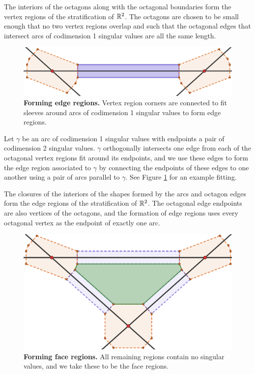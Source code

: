 The interiors of the octagons along with the octagonal boundaries form the vertex regions of the stratification of $\mathbb{R}^2$.
The octagons are chosen to be small enough that no two vertex regions overlap and such that the octagonal edges that intersect arcs of codimension 1 singular values are all the same length.

\begin{figure}[h!]
	\centering
	\includegraphics[width=\textwidth]{figures/edge-sleeve.png}
	\caption{
		\textbf{Forming edge regions.}
		Vertex region corners are connected to fit sleeves around arcs of codimension 1 singular values to form edge regions.  
	}
	\label{fig:edge-sleeve}
\end{figure}

Let $\gamma$ be an arc of codimension 1 singular values with endpoints a pair of codimension 2 singular values.
$\gamma$ orthogonally intersects one edge from each of the octagonal vertex regions fit around its endpoints, and we use these edges to form the edge region associated to $\gamma$ by connecting the endpoints of these edges to one another using a pair of arcs parallel to $\gamma$.
See Figure \ref{fig:edge-sleeve} for an example fitting.

The closures of the interiors of the shapes formed by the arcs and octagon edges form the edge regions of the stratification of $\mathbb{R}^2$.
The octagonal edge endpoints are also vertices of the octagons, and the formation of edge regions uses every octagonal vertex as the endpoint of exactly one arc.

\begin{figure}[h!]
	\centering
	\includegraphics[width=\textwidth]{figures/face-sleeve.png}
	\caption{
		\textbf{Forming face regions.}
		All remaining regions contain no singular values, and we take these to be the face regions.
	}
	\label{fig:face-sleeve}
\end{figure}

